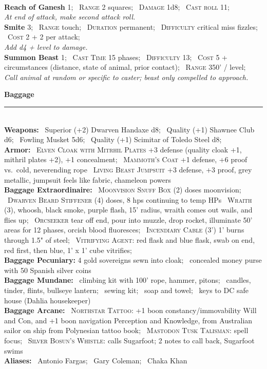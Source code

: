 \documentclass[11pt]{article}
\newcommand{\heading}[1]{{\sc\bfseries #1}}
\newcommand{\spell}[1]{{\sc\bfseries\large #1}}
\begin{document}
%
\\[4pt]
%
\spell{Reach of Ganesh} 1;
\ \textsc{Range} 2 squares;
\ \textsc{Damage} 1d8;
\ \textsc{Cast roll} 11;
\\
\textsl{At end of attack, make second attack roll.}
%
\\[4pt]
%
\spell{Smite} 3;
\ \textsc{Range} touch;
\ \textsc{Duration} permanent;
\ \textsc{Difficulty} critical miss fizzles;
\ \textsc{Cost} 2 + 2 per attack;
\\
\textsl{Add d4 + level to damage.}
%
\\[4pt]
%
\spell{Summon Beast} 1;
\ \textsc{Cast Time} 15 phases;
\ \textsc{Difficulty} 13;
\ \textsc{Cost} 5 + circumstances (distance, state of animal, prior
contact);
\ \textsc{Range} 350' / level;
\\
\textsl{Call animal at random or specific to caster; beast only
  compelled to approach.}

\clearpage
\noindent
{\sc\bfseries\Large Baggage}
\vspace*{4pt}
\hrule
\mbox{ }
\\[4pt]
\heading{Weapons:}
\ Superior (+2) Dwarven Handaxe d8;
\ Quality (+1) Shawnee Club d6;
\ Fowling Musket 5d6;
\ Quality (+1) Scimitar of Toledo Steel d8;
%
\\[6pt]
%
\heading{Armor:}
\ \textsc{Elven Cloak with Mitrhil Plates} +3 defense (quality cloak
+1, mithril plates +2), +1 concealment;
\ \textsc{Mammoth's Coat} +1 defense, +6 proof vs.\ cold, neverending rope
\ \textsc{Living Beast Jumpsuit} +3 defense, +3 proof, grey metallic,
jumpsuit feels like fabric, chameleon powers
%
\\[6pt]
%
\heading{Baggage Extraordinaire:}
\ \textsc{Moonvision Snuff Box} (2) doses moonvision;
\ \textsc{Dwarven Beard Stiffener} (4) doses, 8 hps continuing to temp
HPs
\ \textsc{Wraith} (3), whoosh, black smoke, purple flash, 15' radius,
wraith comes out wails, and flies up;
\ \textsc{Orcseeker} tear off end, pour into muzzle, drop rocket,
illuminate 50' areas for 12 phases, orcish blood fluoresces;
\ \textsc{Incendiary Cable} (3') 1' burns through 1.5" of steel;
\ \textsc{Vitrifying Agent}: red flask and blue flask, swab on end,
red first, then blue, 1' x 1' cube vitrifies;
%
\\[6pt]
%
\heading{Baggage Pecuniary:}
4 gold sovereigns sewn into cloak;
\ concealed money purse with 50 Spanish silver coins
%
\\[6pt]
%
\heading{Baggage Mundane:}
\ climbing kit with 100' rope, hammer, pitons;
\ candles, tinder, flints, bullseye lantern;
\ sewing kit;
\ soap and towel;
\ keys to DC safe house (Dahlia housekeeper)
%
\\[6pt]
%
\heading{Baggage Arcane:}
\ \textsc{Northstar Tattoo:} +1 boon constancy/immovability Will and Con,
and +1 boon navigation Perception and Knowledge,
from Australian sailor on ship from Polynesian tattoo book;
\ \textsc{Mastodon Tusk Talisman:} spell focus;
\ \textsc{Silver Bosun's Whistle:} calls Sugarfoot; 2 notes to call
back, Sugarfoot swims
%
\\[6pt]
\heading{Aliases:} \ Antonio Fargas; \ Gary Coleman; \ Chaka Khan
%
\end{document}
